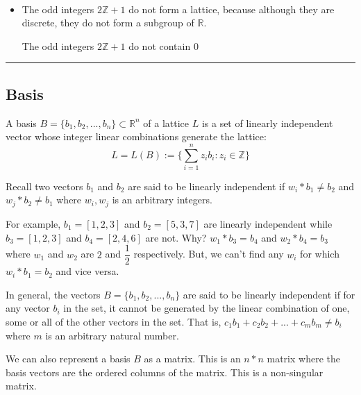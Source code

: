 \documentclass[11pt]{article}
\begin{document}
    \begin{center}
    \end{center}
    { \hspace*{\fill} \\}
    
    \begin{itemize}
\item
  The odd integers \(2\mathbb{Z} + 1\) do not form a lattice, because
  although they are discrete, they do not form a subgroup of
  \(\mathbb{R}\).

  The odd integers \(2\mathbb{Z} + 1\) do not contain 0
\end{itemize}

\begin{center}\rule{0.5\linewidth}{0.5pt}\end{center}

    \subsection{Basis}\label{basis}

    A basis \(B = \{b_1, b_2, ..., b_n\} \subset \mathbb{R}^n\) of a lattice
\(L\) is a set of linearly independent vector whose integer linear
combinations generate the
lattice:\[L = L(B):= \{\sum_{i = 1}^{n}z_ib_i: z_i \in \mathbb{Z}\}\]

Recall two vectors \(b_1\) and \(b_2\) are said to be linearly
independent if \(w_i * b_1 \neq b_2\) and \(w_j * b_2 \neq b_1\) where
\(w_i, w_j\) is an arbitrary integers.

For example, \(b_1 = [1, 2, 3]\) and \(b_2 = [5, 3, 7]\) are linearly
independent while \(b_3 = [1, 2, 3]\) and \(b_4 = [2, 4, 6]\) are not.
Why? \(w_1 * b_3 = b_4\) and \(w_2 * b_4 = b_3\) where \(w_1\) and
\(w_2\) are \(2\) and \(\dfrac{1}{2}\) respectively. But, we can't find
any \(w_i\) for which \(w_i * b_1 = b_2\) and vice versa.

In general, the vectors \(B = \{b_1, b_2, ..., b_n\}\) are said to be
linearly independent if for any vector \(b_i\) in the set, it cannot be
generated by the linear combination of one, some or all of the other
vectors in the set. That is, \(c_1b_1 + c_2b_2 + ... + c_mb_m \neq b_i\)
where \(m\) is an arbitrary natural number.

We can also represent a basis \(B\) as a matrix. This is an \(n*n\)
matrix where the basis vectors are the ordered columns of the matrix.
This is a non-singular matrix.
\end{document}
